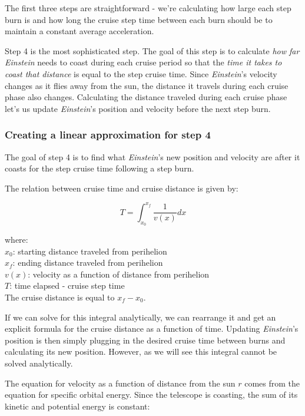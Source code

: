 \documentclass[12pt]{article} %
\begin{document}
The first three steps are straightforward - we're calculating how large each step burn is and how long the cruise step time between each burn should be to maintain a constant average acceleration.

Step 4 is the most sophisticated step. The goal of this step is to calculate \textit{how far} \textit{Einstein} needs to coast during each cruise period so that the \textit{time it takes to coast that distance} is equal to the step cruise time. Since \textit{Einstein}'s velocity changes as it flies away from the sun, the distance it travels during each cruise phase also changes. Calculating the distance traveled during each cruise phase let's us update \textit{Einstein}'s position and velocity before the next step burn.

\subsubsection{Creating a linear approximation for step 4}
The goal of step 4 is to find what \textit{Einstein}'s new position and velocity are after it coasts for the step cruise time following a step burn.

The relation between cruise time and cruise distance is given by: 

$$T = \int_{x_0}^{x_f} \frac{1}{v(x)} dx$$

where:\\
$x_0$: starting distance traveled from perihelion\\
$x_f$: ending distance traveled from perihelion\\
$v(x)$: velocity as a function of distance from perihelion\\
$T$: time elapsed - cruise step time\\

The cruise distance is equal to $x_f - x_0$.

If we can solve for this integral analytically, we can rearrange it and get an explicit formula for the cruise distance as a function of time. Updating \textit{Einstein}'s position is then simply plugging in the desired cruise time between burns and calculating its new position. However, as we will see this integral cannot be solved analytically.

The equation for velocity as a function of distance from the sun $r$ comes from the equation for specific orbital energy. Since the telescope is coasting, the sum of its kinetic and potential energy is constant:
\end{document}

